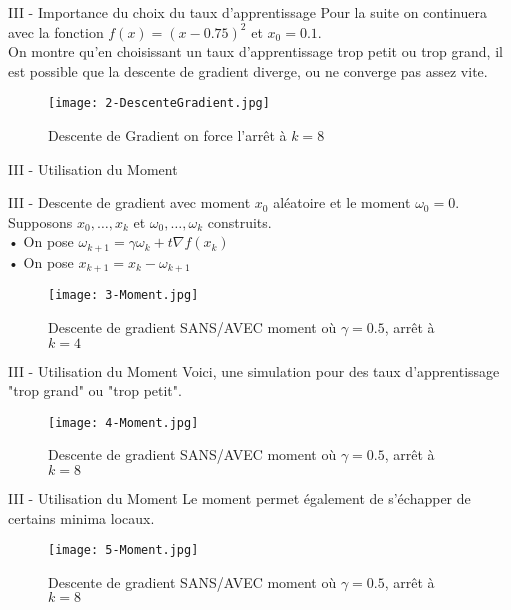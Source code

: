 \begin{frame}{III - Importance du choix du taux d'apprentissage}
    Pour la suite on continuera avec la fonction $f(x) = (x-0.75)^2$ et $x_0=0.1$. \\
    On montre qu'en choisissant un taux d'apprentissage trop petit ou trop grand, il est possible que la descente de gradient diverge, ou ne converge pas assez vite.
    \begin{figure}
        \centering
        \texttt{[image: 2-DescenteGradient.jpg]}
        \caption{Descente de Gradient on force l'arrêt à $k=8$}
    \end{figure}
\end{frame}

\begin{frame}{III - Utilisation du Moment}
    \begin{block}{III - Descente de gradient avec moment}
        $x_0$ aléatoire et le moment $\omega_0 = 0$.
        Supposons $x_0, \ldots, x_k$ et $\omega_0, \ldots, \omega_k$ construits. \\
        • On pose $\omega_{k+1} = \gamma \omega_k + t \nabla f(x_k)$ \\
        • On pose $x_{k+1} = x_k - \omega_{k+1}$
    \end{block}
    \begin{figure}
        \centering
        \texttt{[image: 3-Moment.jpg]}
        \caption{Descente de gradient SANS/AVEC moment où $\gamma = 0.5$, arrêt à $k=4$}
    \end{figure}
\end{frame}

\begin{frame}{III - Utilisation du Moment}
    Voici, une simulation pour des taux d'apprentissage "trop grand" ou "trop petit".
    \begin{figure}
        \centering
        \texttt{[image: 4-Moment.jpg]}
        \caption{Descente de gradient SANS/AVEC moment où $\gamma = 0.5$, arrêt à $k=8$}
    \end{figure}
\end{frame}

\begin{frame}{III - Utilisation du Moment}
    Le moment permet également de s'échapper de certains minima locaux.
    \begin{figure}
        \centering
        \texttt{[image: 5-Moment.jpg]}
        \caption{Descente de gradient SANS/AVEC moment où $\gamma = 0.5$, arrêt à $k=8$}
    \end{figure}
\end{frame}

